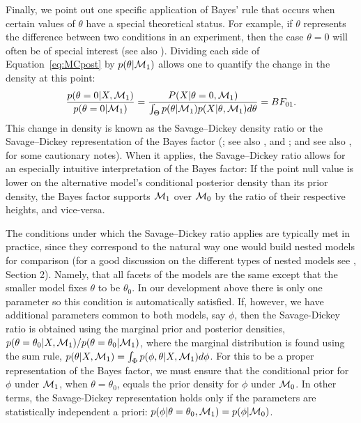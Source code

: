 Finally, we point out one specific application of Bayes' rule that occurs when certain values of $\theta$ have a special theoretical status. For example, if $\theta$ represents the difference between two conditions in an experiment, then the case $\theta=0$ will often be of special interest (see also ). Dividing each side of Equation~\ref{eq:MCpost} by $p(\theta|{\cal M}_1)$ allows one to quantify the change in the density at this point: $$\frac{p(\theta=0|X,{\cal M}_1)}{p(\theta=0|{\cal M}_1)} = \frac{P(X|\theta=0,{\cal M}_1)}{\int_\Theta p(\theta|{\cal M}_1)p(X|\theta,{\cal M}_1)d\theta} = BF_{01}.$$ This change in density is known as the Savage--Dickey density ratio or the Savage--Dickey representation of the Bayes factor (; see also , and ; and see also , for some cautionary notes). When it applies, the Savage--Dickey ratio allows for an especially intuitive interpretation of the Bayes factor: If the point null value is lower on the alternative model's conditional posterior density than its prior density, the Bayes factor supports ${\cal M}_1$ over ${\cal M}_0$ by the ratio of their respective heights, and vice-versa.

The conditions under which the Savage--Dickey ratio applies are typically met in practice, since they correspond to the natural way one would build nested models for comparison {(for a good discussion on the different types of nested models see , Section 2)}. Namely, that all facets of the models are the same except that the smaller model fixes $\theta$ to be $\theta_0$. In our development above there is only one parameter so this condition is automatically satisfied. If, however, we have additional parameters common to both models, say $\phi$, then the Savage-Dickey ratio is obtained using the marginal prior and posterior densities, $p(\theta=\theta_0|X,{\cal M}_1)/p(\theta=\theta_0|{\cal M}_1)$, where the marginal distribution is found using the sum rule, $p(\theta|X,{\cal M}_1)=\int_\Phi p(\phi,\theta|X,{\cal M}_1)d\phi$. For this to be a proper representation of the Bayes factor, we must ensure that the conditional prior for $\phi$ under ${\cal M}_1$, when $\theta=\theta_0$, equals the prior density for $\phi$ under ${\cal M}_0$. In other terms, the Savage-Dickey representation holds only if the parameters are statistically independent a priori: $p(\phi|\theta=\theta_0,{\cal M}_1) = p(\phi|{\cal M}_0)$.

